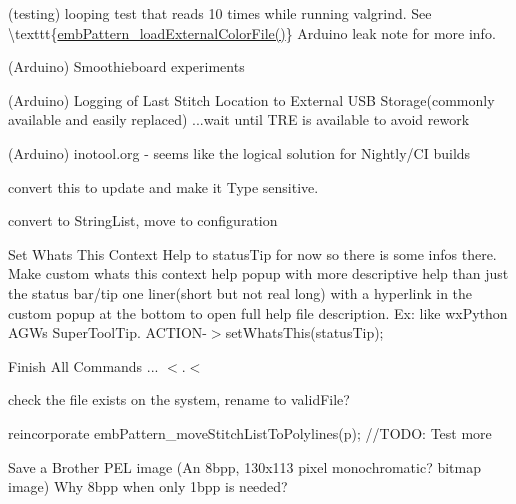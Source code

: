 \begin{DoxyRefList}
\label{todo__todo000194}%
%
(testing) looping test that reads 10 times while running valgrind. See \textbackslash{}texttt\{\mbox{\hyperlink{embroidery_8h_a3bf191bd99e2da8d36465f454a4646f6}{emb\+Pattern\+\_\+load\+External\+Color\+File()}}\} Arduino leak note for more info.

\label{todo__todo000193}%
%
(Arduino) Smoothieboard experiments

\label{todo__todo000191}%
%
(Arduino) Logging of Last Stitch Location to External USB Storage(commonly available and easily replaced) ...wait until TRE is available to avoid rework

\label{todo__todo000192}%
%
(Arduino) inotool.\+org -\/ seems like the logical solution for Nightly/\+CI builds 
\item[Member \mbox{\hyperlink{classGeometry_a1545e793f7715b0886a884790622f847}{Geometry\+::calculate\+Arc\+Data}} (Emb\+Arc arc)]\label{todo__todo000015}%
%
convert this to update and make it Type sensitive.  
\item[Member \mbox{\hyperlink{objects_8cpp_aef9addca2233bf242fc9afb674437d3e}{justify\+\_\+options}} ]\label{todo__todo000014}%
%
convert to String\+List, move to configuration  
\item[Member \mbox{\hyperlink{classMainWindow_a5de9bc12f363ba45fb8082f262d24deb}{Main\+Window\+::create\+All\+Actions}} ()]\label{todo__todo000009}%
%
Set What\textquotesingle{}s This Context Help to status\+Tip for now so there is some infos there. Make custom whats this context help popup with more descriptive help than just the status bar/tip one liner(short but not real long) with a hyperlink in the custom popup at the bottom to open full help file description. Ex\+: like wx\+Python AGW\textquotesingle{}s Super\+Tool\+Tip. ACTION-\/$>$set\+Whats\+This(status\+Tip); 

Finish All Commands ... $<$.$<$ 
\item[Member \mbox{\hyperlink{classMainWindow_a88cd696e2b4605d81cb1d3b021211854}{Main\+Window\+::valid\+File\+Format}} (QString file\+Name)]\label{todo__todo000010}%
%
check the file exists on the system, rename to valid\+File?  
\item[Member \mbox{\hyperlink{classMdiWindow_a2b18820f8e815fc23793ed4cd2b158ca}{Mdi\+Window\+::load\+File}} (QString file\+Name)]\label{todo__todo000011}%
%
reincorporate emb\+Pattern\+\_\+move\+Stitch\+List\+To\+Polylines(p); //\+TODO\+: Test more  
\item[Member \mbox{\hyperlink{classMdiWindow_a2167cf71975c040208ae05b7b6b10a2f}{Mdi\+Window\+::save\+BMC}} ()]\label{todo__todo000012}%
%
Save a Brother PEL image (An 8bpp, 130x113 pixel monochromatic? bitmap image) Why 8bpp when only 1bpp is needed?


\end{DoxyRefList}
